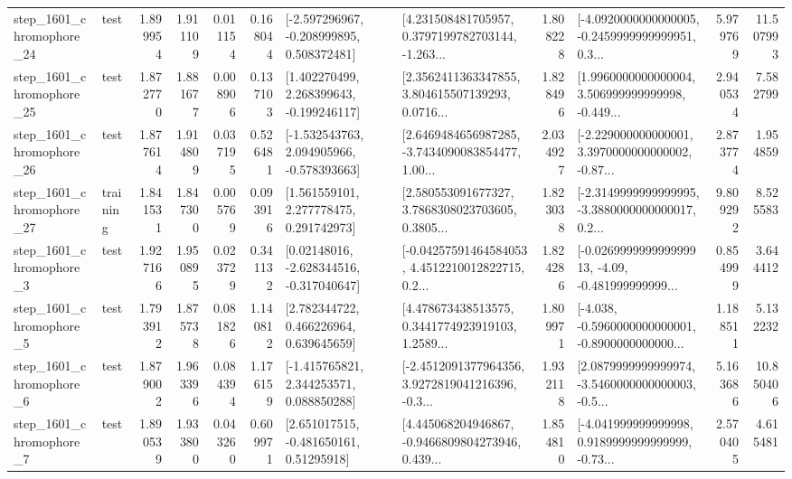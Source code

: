 \begin{tabular}{llrrrrllrlrr}
 step\_1601\_chromophore\_24 &      test &      1.899954 &    1.911109 &      0.011154 &  0.168044 &   [-2.597296967, -0.208999895, 0.508372481] &  [4.231508481705957, 0.3797199782703144, -1.263... &       1.808228 &  [-4.0920000000000005, -0.2459999999999951, 0.3... &            5.979769 &         11.507993 \\
 step\_1601\_chromophore\_25 &      test &      1.872770 &    1.881677 &      0.008906 &  0.137103 &    [1.402270499, 2.268399643, -0.199246117] &  [2.3562411363347855, 3.804615507139293, 0.0716... &       1.828496 &  [1.9960000000000004, 3.506999999999998, -0.449... &            2.940534 &          7.582799 \\
 step\_1601\_chromophore\_26 &      test &      1.877614 &    1.914809 &      0.037195 &  0.526481 &   [-1.532543763, 2.094905966, -0.578393663] &  [2.6469484656987285, -3.7434090083854477, 1.00... &       2.034927 &  [-2.229000000000001, 3.3970000000000002, -0.87... &            2.873774 &          1.954859 \\
 step\_1601\_chromophore\_27 &  training &      1.841531 &    1.847300 &      0.005769 &  0.093916 &     [1.561559101, 2.277778475, 0.291742973] &  [2.580553091677327, 3.7868308023703605, 0.3805... &       1.823038 &  [-2.3149999999999995, -3.3880000000000017, 0.2... &            9.809292 &          8.525583 \\
  step\_1601\_chromophore\_3 &      test &      1.927166 &    1.950895 &      0.023729 &  0.341132 &    [0.02148016, -2.628344516, -0.317040647] &  [-0.04257591464584053, 4.4512210012822715, 0.2... &       1.824286 &  [-0.026999999999999913, -4.09, -0.481999999999... &            0.854999 &          3.644412 \\
  step\_1601\_chromophore\_5 &      test &      1.793912 &    1.875738 &      0.081826 &  1.140812 &     [2.782344722, 0.466226964, 0.639645659] &  [4.478673438513575, 0.3441774923919103, 1.2589... &       1.809971 &  [-4.038, -0.5960000000000001, -0.8900000000000... &            1.188511 &          5.132232 \\
  step\_1601\_chromophore\_6 &      test &      1.879002 &    1.963396 &      0.084394 &  1.176159 &    [-1.415765821, 2.344253571, 0.088850288] &  [-2.4512091377964356, 3.9272819041216396, -0.3... &       1.932118 &  [2.0879999999999974, -3.5460000000000003, -0.5... &            5.163686 &         10.850406 \\
  step\_1601\_chromophore\_7 &      test &      1.890539 &    1.933800 &      0.043260 &  0.609971 &     [2.651017515, -0.481650161, 0.51295918] &  [4.445068204946867, -0.9466809804273946, 0.439... &       1.854810 &  [-4.041999999999998, 0.9189999999999999, -0.73... &            2.570405 &          4.615481 \\

\end{tabular}
